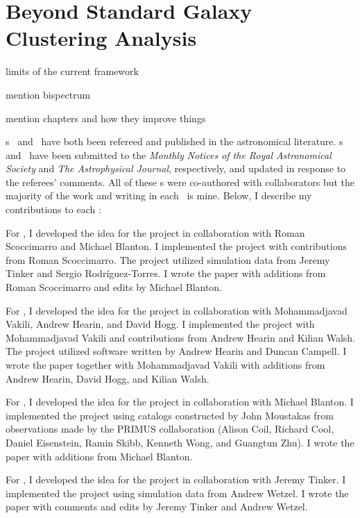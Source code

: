 \section{Beyond Standard Galaxy Clustering Analysis}%

\begin{enumerate}
{\item 
limits of the current framework
}
{\item 
mention bispectrum
}
{\item 
mention chapters and how they improve things
}
\end{enumerate}

\chapname s~ and~ have both been refereed and
published in the astronomical literature.
\chapname s~ and~ have been submitted to the 
\emph{Monthly Notices of the Royal Astronomical Society} and \emph{The Astrophysical Journal},
respectively, and updated in response to the referees' comments.
All of these \chapname s were co-authored with collaborators but the majority
of the work and writing in each \chapname\ is mine.
Below, I describe my contributions to each \chapname:
\begin{enumerate}

{\item 
For , I developed the idea for the project in collaboration with Roman
Scoccimarro and Michael Blanton. I implemented the project with contributions 
from Roman Scoccimarro. The project utilized simulation data from Jeremy Tinker
and Sergio Rodr\'{i}guez-Torres. I wrote the paper with additions from 
Roman Scoccimarro and edits by Michael Blanton. 
}

{\item 
For , I developed the idea for the project in collaboration with 
Mohammadjavad Vakili, Andrew Hearin, and David Hogg. I implemented the project 
with Mohammadjavad Vakili and contributions from Andrew Hearin and Kilian Walsh.
The project utilized software written by Andrew Hearin and Duncan Campell. 
I wrote the paper together with Mohammadjavad Vakili with additions from
Andrew Hearin, David Hogg, and Kilian Walsh.
}

{\item 
For , I developed the idea for the project in collaboration with 
Michael Blanton. I implemented the project using catalogs constructed by 
John Moustakas from observations made by the PRIMUS collaboration (Alison Coil,
Richard Cool, Daniel Eisenstein, Ramin Skibb, Kenneth Wong, and Guangtun Zhu).
I wrote the paper with additions from Michael Blanton. 
}

{\item 
For , I developed the idea for the project in collaboration with 
Jeremy Tinker. I implemented the project using simulation data from Andrew 
Wetzel. I wrote the paper with comments and edits by Jeremy Tinker and Andrew 
Wetzel. 
}
\end{enumerate}
